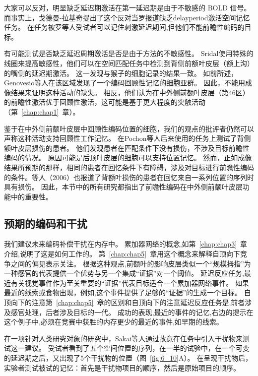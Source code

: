 大家可以反对，明显缺乏延迟期激活在第一延迟期是由于不敏感的 BOLD 信号。
而事实上，戈德曼-拉基奇\cite{goldman2002functional}提出了这个反对当罗\cite{rowe2000prefrontal}报道缺乏delayperiod激活空间记忆任务。
在任务被罗等人受试者可以记住刺激延迟期间,但他们不能前瞻性编码的目标。


有可能测试是否缺乏延迟周期激活是否是由于方法的不敏感性。
Sridal\cite{srimal2008persistent}使用特殊的线圈来提高敏感性，他们可以在空间匹配任务中检测到背侧前额叶皮层（额上沟）的嘴侧的延迟期激活。
这一发现与猴子的细胞记录的结果一致。
如前所述，Genovesio等人\cite{genovesio2006representation}在该区域发现了一个编码回顾性记忆的细胞亚群。
因此，不能用成像结果来证明这种活动的缺失。
相反，他们认为在中外侧前额叶皮层（第46区）的前瞻性激活优于回顾性激活，这可能是基于更大程度的突触活动（第~\ref{chap:chap1}~章）。



鉴于在中外侧前额叶皮层中回顾性编码位置的细胞，我们的观点的批评者仍然可以声称这种活动支持回顾性工作记忆。
在Pochon等人后来使用的任务上测试了背侧额叶皮层损伤的患者。
他们发现患者在匹配条件下没有损伤，不涉及目标前瞻性编码的情况。
原因可能是后顶叶皮层的细胞可以支持位置记忆。
然而，正如成像结果所预期的那样，相同的患者在回忆条件下有障碍，涉及对目标进行前瞻性编码的条件\cite{ferreira1998spatio}。等人（2006）也报道了背额叶损伤的患者在回忆来自一系列位置的序列时具有损伤。
因此，本节中的所有研究都指出了前瞻性编码在中外侧前额叶皮层功能中的重要性。



\subsection{预期的编码和干扰}

我们建议未来编码补偿干扰在内存中。
累加器网络的概念,如第~\ref{chap:chap3}~章介绍,说明了这是如何工作的。
第~\ref{chap:chap5}~章用这个概念来解释自顶向下竞争之间的偏见表示关注。
根据这种观点,前额叶的影响皮层类似一个“规模拇指”为一种感官的代表提供一个优势与另一个集成“证据”对一个阈值。
延迟反应任务,最近有关视觉事件作为至关重要的“证据”代表目标适合一个累加器网络事件。
如果最近的线索或食物出现，例如,这个事件提供了足够的“证据”的生成一个目标。
自顶向下的注意第~\ref{chap:chap5}~章的区别和自顶向下的注意延迟反应任务是,前者涉及感官处理，后者涉及目标的一代。
成功的表现,最近的事件的记忆,右边的提示在这个例子中,必须在竞赛中获胜的内存更少的最近的事件,如早期的线索。


在一项针对人类研究对象的研究中，Sakai等人\cite{sakai2002active}通过故意在任务中引入干扰物来测试这一建议。
受试者看到了五个空间位置的序列，在一半的试验中，在一个可变的延迟期之后，又出现了5个干扰物的位置（图~\ref{fig:6_10}A）。
在呈现干扰物后，实验者测试被试的记忆：首先是干扰物项目的顺序，然后是原始项目的顺序。


